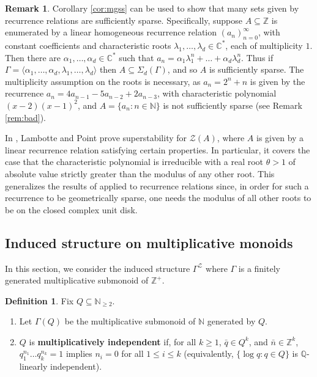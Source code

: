 \documentclass{amsart}
\def\seq{\subseteq}
\newcommand{\cZ}{\mathcal{Z}}
\def\C{\mathbb C}
\def\N{\mathbb N}
\def\Q{\mathbb Q}
\def\Z{\mathbb Z}
\theoremstyle{definition}
\newtheorem{definition}[theorem]{Definition}
\newtheorem{remark}[theorem]{Remark}
\begin{document}
\begin{remark}\label{rem:LHRR}
Corollary \ref{cor:mgss} can be used to show that many sets given by recurrence relations are sufficiently sparse. Specifically, suppose $A\seq\Z$ is enumerated by a linear homogeneous recurrence relation $(a_n)_{n=0}^\infty$, with constant coefficients and characteristic roots $\lambda_1,\ldots,\lambda_d\in\C^*$, each of multiplicity $1$. Then there are $\alpha_1,\ldots,\alpha_d\in\C^*$ such that $a_n=\alpha_1\lambda^n_1+\ldots+\alpha_d\lambda^n_d$. Thus if $\Gamma=\langle \alpha_1,\ldots,\alpha_d,\lambda_1,\ldots,\lambda_d\rangle$ then $A\seq\Sigma_d(\Gamma)$, and so $A$ is sufficiently sparse. The multiplicity assumption on the roots is necessary, as $a_n=2^n+n$ is given by the recurrence $a_n=4a_{n-1}-5a_{n-2}+2a_{n-3}$, with characteristic polynomial $(x-2)(x-1)^2$, and $A=\{a_n:n\in\N\}$ is not sufficiently sparse (see Remark \ref{rem:bad}).

In \cite{PoLa}, Lambotte and Point prove superstability for $\cZ(A)$, where $A$ is given by a linear recurrence relation satisfying certain properties. In particular, it covers the case that the characteristic polynomial is irreducible with a real root $\theta>1$ of absolute value strictly greater than the modulus of any other root. This generalizes the results of \cite{CoSS} applied to recurrence relations since, in order for such a recurrence to be geometrically sparse, one needs the modulus of all other roots to be on the closed complex unit disk. 
\end{remark}


\subsection{Induced structure on multiplicative monoids}

In this section, we consider the induced structure $\Gamma^{\cZ}$ where $\Gamma$ is a finitely generated multiplicative submonoid of $\Z^+$.

\begin{definition}
Fix $Q\seq\N_{\geq2}$.
\begin{enumerate}
\item Let $\Gamma(Q)$ be the multiplicative submonoid of $\N$ generated by $Q$. 
\item $Q$ is \textbf{multiplicatively independent} if, for all $k\geq 1$, $\bar{q}\in Q^k$, and $\bar{n}\in\Z^k$, $q_1^{n_1}\ldots q_k^{n_k}=1$ implies $n_i=0$ for all $1\leq i\leq k$ (equivalently, $\{\log q:q\in Q\}$ is $\Q$-linearly independent).
\end{enumerate}
\end{definition}
\end{document}
